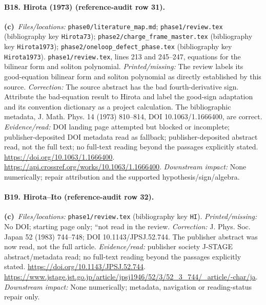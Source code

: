 \documentclass[11pt,a4paper]{article}
\newcommand{\C}{\textbf{(c)}\ }
\newcommand{\file}[1]{\nolinkurl{#1}}
\begin{document}
\paragraph{B18. Hirota (1973) (reference-audit row 31).}
\C \textit{Files/locations:} \file{phase0/literature_map.md}; \file{phase1/review.tex} (bibliography key \file{Hirota73}); \file{phase2/charge_frame_master.tex} (bibliography key \file{Hirota1973}); \file{phase2/oneloop_defect_phase.tex} (bibliography key \file{Hirota1973}).
\file{phase1/review.tex}, lines 213 and 245--247, equations for the bilinear form and soliton polynomial.
\textit{Printed/missing:} The review labels its good-equation bilinear form and soliton polynomial as directly established by this source.
\textit{Correction:} The source abstract has the bad fourth-derivative sign. Attribute the bad-equation result to Hirota and label the good-sign adaptation and its convention dictionary as a project calculation. The bibliographic metadata, J. Math. Phys. 14 (1973) 810--814, DOI 10.1063/1.1666400, are correct.
\textit{Evidence/read:} DOI landing page attempted but blocked or incomplete; publisher-deposited DOI metadata read as fallback; publisher-deposited abstract read, not the full text; no full-text reading beyond the passages explicitly stated.
\url{https://doi.org/10.1063/1.1666400}.
\url{https://api.crossref.org/works/10.1063/1.1666400}.
\textit{Downstream impact:} None numerically; repair attribution and the supported hypothesis/sign/algebra.
\paragraph{B19. Hirota--Ito (reference-audit row 32).}
\C \textit{Files/locations:} \file{phase1/review.tex} (bibliography key \file{HI}).
\textit{Printed/missing:} No DOI; starting page only; ``not read in the review.
\textit{Correction:} J. Phys. Soc. Japan 52 (1983) 744--748; DOI 10.1143/JPSJ.52.744. The publisher abstract was now read, not the full article.
\textit{Evidence/read:} publisher society J-STAGE abstract/metadata read; no full-text reading beyond the passages explicitly stated.
\url{https://doi.org/10.1143/JPSJ.52.744}.
\url{https://www.jstage.jst.go.jp/article/jpsj1946/52/3/52_3_744/_article/-char/ja}.
\textit{Downstream impact:} None numerically; metadata, navigation or reading-status repair only.
\end{document}
